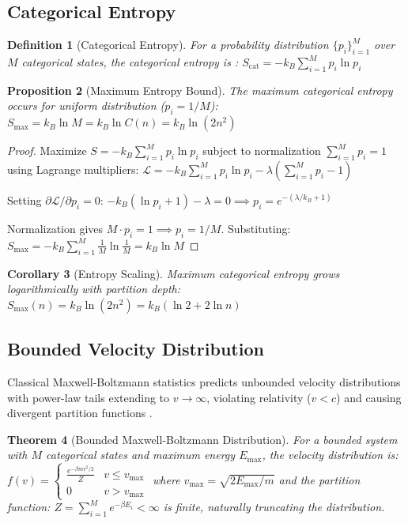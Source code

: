 \documentclass[twocolumn,10pt]{article}
\newtheorem{theorem}{Theorem}[section]
\newtheorem{proposition}[theorem]{Proposition}
\newtheorem{corollary}[theorem]{Corollary}
\newtheorem{definition}[theorem]{Definition}
\begin{document}
\subsection{Categorical Entropy}

\begin{definition}[Categorical Entropy]
\label{def:catentropy}
For a probability distribution $\{p_i\}_{i=1}^{M}$ over $M$ categorical states, the \emph{categorical entropy} is \citep{shannon1948mathematical,boltzmann1877beziehung}:
$
S_{\mathrm{cat}} = -k_B \sum_{i=1}^{M} p_i \ln p_i
$
\end{definition}

\begin{proposition}[Maximum Entropy Bound]
\label{prop:maxent}
The maximum categorical entropy occurs for uniform distribution ($p_i = 1/M$):
$
S_{\max} = k_B \ln M = k_B \ln C(n) = k_B \ln(2n^2)
$
\end{proposition}

\begin{proof}
Maximize $S = -k_B \sum_{i=1}^{M} p_i \ln p_i$ subject to normalization $\sum_{i=1}^{M} p_i = 1$ using Lagrange multipliers:
$
\mathcal{L} = -k_B \sum_{i=1}^{M} p_i \ln p_i - \lambda\left(\sum_{i=1}^{M} p_i - 1\right)
$

Setting $\partial \mathcal{L}/\partial p_i = 0$:
$
-k_B(\ln p_i + 1) - \lambda = 0 \implies p_i = e^{-(\lambda/k_B + 1)}
$

Normalization gives $M \cdot p_i = 1 \implies p_i = 1/M$. Substituting:
$
S_{\max} = -k_B \sum_{i=1}^{M} \frac{1}{M} \ln\frac{1}{M} = k_B \ln M
$
\end{proof}

\begin{corollary}[Entropy Scaling]
\label{cor:entropy_scaling}
Maximum categorical entropy grows logarithmically with partition depth:
$
S_{\max}(n) = k_B \ln(2n^2) = k_B(\ln 2 + 2\ln n)
$
\end{corollary}

\subsection{Bounded Velocity Distribution}

Classical Maxwell-Boltzmann statistics predicts unbounded velocity distributions with power-law tails extending to $v \to \infty$, violating relativity ($v < c$) and causing divergent partition functions \citep{maxwell1871theory,landau1980statistical}.

\begin{theorem}[Bounded Maxwell-Boltzmann Distribution]
\label{thm:maxwell}
For a bounded system with $M$ categorical states and maximum energy $E_{\max}$, the velocity distribution is:
$
f(v) = \begin{cases}
\frac{e^{-\beta m v^2/2}}{Z} & v \leq v_{\max} \\
0 & v > v_{\max}
\end{cases}
$
where $v_{\max} = \sqrt{2E_{\max}/m}$ and the partition function:
$
Z = \sum_{i=1}^{M} e^{-\beta E_i} < \infty
$
is finite, naturally truncating the distribution.
\end{theorem}
\end{document}
